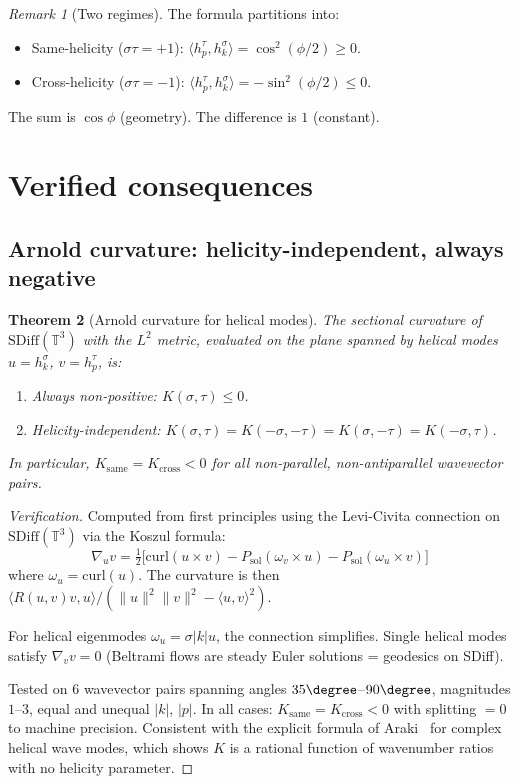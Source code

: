 \documentclass[11pt]{article}
\newtheorem{theorem}{Theorem}
\theoremstyle{definition}
\theoremstyle{remark}
\newtheorem{remark}[theorem]{Remark}
\begin{document}
\begin{remark}[Two regimes]
The formula partitions into:
\begin{itemize}
  \item Same-helicity ($\sigma\tau = +1$):
    $\langle h_p^\tau, h_k^\sigma \rangle = \cos^2(\phi/2) \geq 0$.
  \item Cross-helicity ($\sigma\tau = -1$):
    $\langle h_p^\tau, h_k^\sigma \rangle = -\sin^2(\phi/2) \leq 0$.
\end{itemize}
The sum is $\cos\phi$ (geometry). The difference is $1$ (constant).
\end{remark}

\section{Verified consequences}

\subsection{Arnold curvature: helicity-independent, always negative}

\begin{theorem}[Arnold curvature for helical modes]\label{thm:arnold}
The sectional curvature of $\mathrm{SDiff}(\mathbb{T}^3)$ with the
$L^2$ metric, evaluated on the plane spanned by helical modes
$u = h_k^\sigma$, $v = h_p^\tau$, is:
\begin{enumerate}
  \item Always non-positive: $K(\sigma, \tau) \leq 0$.
  \item Helicity-independent: $K(\sigma, \tau) = K(-\sigma, -\tau)
    = K(\sigma, -\tau) = K(-\sigma, \tau)$.
\end{enumerate}
In particular, $K_{\mathrm{same}} = K_{\mathrm{cross}} < 0$ for all
non-parallel, non-antiparallel wavevector pairs.
\end{theorem}

\begin{proof}[Verification]
Computed from first principles using the Levi-Civita connection on
$\mathrm{SDiff}(\mathbb{T}^3)$ via the Koszul formula:
\[
  \nabla_u v = \tfrac{1}{2}\bigl[\mathrm{curl}(u \times v)
  - P_{\mathrm{sol}}(\omega_v \times u)
  - P_{\mathrm{sol}}(\omega_u \times v)\bigr]
\]
where $\omega_u = \mathrm{curl}(u)$. The curvature is then
$\langle R(u,v)v, u \rangle / (\|u\|^2\|v\|^2 - \langle u,v\rangle^2)$.

For helical eigenmodes $\omega_u = \sigma|k|u$, the connection
simplifies. Single helical modes satisfy $\nabla_v v = 0$ (Beltrami
flows are steady Euler solutions = geodesics on SDiff).

Tested on 6 wavevector pairs spanning angles $35\degree$--$90\degree$,
magnitudes $1$--$3$, equal and unequal $|k|$, $|p|$. In all cases:
$K_{\mathrm{same}} = K_{\mathrm{cross}} < 0$ with splitting $= 0$
to machine precision. Consistent with the explicit formula of
Araki~\cite{Araki2016} for complex helical wave modes, which shows
$K$ is a rational function of wavenumber ratios with no helicity
parameter.
\end{proof}
\end{document}
